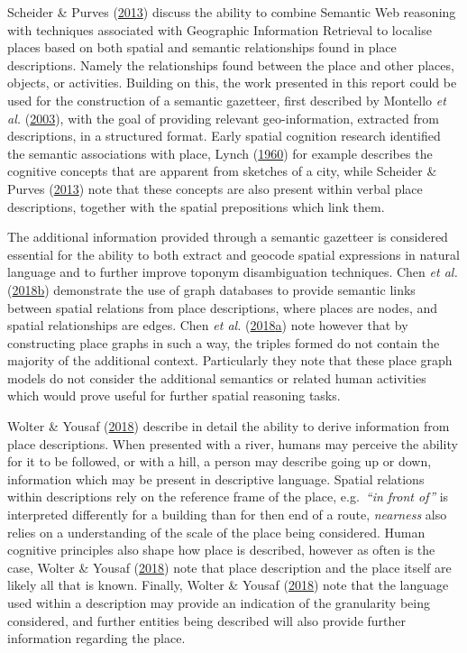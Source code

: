 \documentclass[10pt,]{article}
\begin{document}
Scheider \& Purves (\protect\hyperlink{ref-scheider2013}{2013}) discuss
the ability to combine Semantic Web reasoning with techniques associated
with Geographic Information Retrieval to localise places based on both
spatial and semantic relationships found in place descriptions. Namely
the relationships found between the place and other places, objects, or
activities. Building on this, the work presented in this report could be
used for the construction of a semantic gazetteer, first described by
Montello \emph{et al.} (\protect\hyperlink{ref-montello2003}{2003}),
with the goal of providing relevant geo-information, extracted from
descriptions, in a structured format. Early spatial cognition research
identified the semantic associations with place, Lynch
(\protect\hyperlink{ref-lynch1960}{1960}) for example describes the
cognitive concepts that are apparent from sketches of a city, while
Scheider \& Purves (\protect\hyperlink{ref-scheider2013}{2013}) note
that these concepts are also present within verbal place descriptions,
together with the spatial prepositions which link them.

The additional information provided through a semantic gazetteer is
considered essential for the ability to both extract and geocode spatial
expressions in natural language and to further improve toponym
disambiguation techniques. Chen \emph{et al.}
(\protect\hyperlink{ref-chen2018}{2018}\protect\hyperlink{ref-chen2018}{b})
demonstrate the use of graph databases to provide semantic links between
spatial relations from place descriptions, where places are nodes, and
spatial relationships are edges. Chen \emph{et al.}
(\protect\hyperlink{ref-chen2018a}{2018}\protect\hyperlink{ref-chen2018a}{a})
note however that by constructing place graphs in such a way, the
triples formed do not contain the majority of the additional context.
Particularly they note that these place graph models do not consider the
additional semantics or related human activities which would prove
useful for further spatial reasoning tasks.

Wolter \& Yousaf (\protect\hyperlink{ref-wolter2018}{2018}) describe in
detail the ability to derive information from place descriptions. When
presented with a river, humans may perceive the ability for it to be
followed, or with a hill, a person may describe going up or down,
information which may be present in descriptive language. Spatial
relations within descriptions rely on the reference frame of the place,
e.g.~\emph{``in front of''} is interpreted differently for a building
than for then end of a route, \emph{nearness} also relies on a
understanding of the scale of the place being considered. Human
cognitive principles also shape how place is described, however as often
is the case, Wolter \& Yousaf (\protect\hyperlink{ref-wolter2018}{2018})
note that place description and the place itself are likely all that is
known. Finally, Wolter \& Yousaf
(\protect\hyperlink{ref-wolter2018}{2018}) note that the language used
within a description may provide an indication of the granularity being
considered, and further entities being described will also provide
further information regarding the place.
\end{document}
